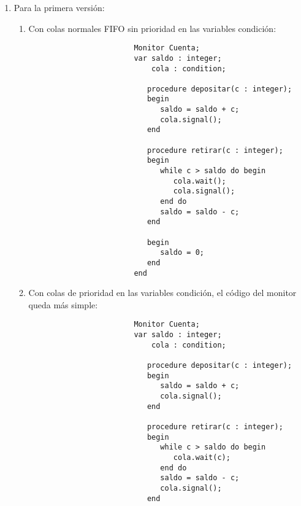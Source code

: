 \begin{ejercicio}
    \begin{enumerate}
        \item Para la primera versión:
            \begin{enumerate}[label=\alph*)]
                \item Con colas normales FIFO sin prioridad en las variables condición:
                    \begin{verbatim}
                        Monitor Cuenta;
                        var saldo : integer;
                            cola : condition;

                           procedure depositar(c : integer);
                           begin
                              saldo = saldo + c;
                              cola.signal();
                           end

                           procedure retirar(c : integer);
                           begin
                              while c > saldo do begin
                                 cola.wait();
                                 cola.signal();
                              end do
                              saldo = saldo - c;
                           end

                           begin
                              saldo = 0;
                           end
                        end
                    \end{verbatim}
                \item Con colas de prioridad en las variables condición, el código del monitor queda más simple:
                    \begin{verbatim}
                        Monitor Cuenta;
                        var saldo : integer;
                            cola : condition;

                           procedure depositar(c : integer);
                           begin
                              saldo = saldo + c;
                              cola.signal();
                           end

                           procedure retirar(c : integer);
                           begin
                              while c > saldo do begin
                                 cola.wait(c);
                              end do
                              saldo = saldo - c;
                              cola.signal();
                           end


\end{verbatim}
\end{enumerate}
\end{enumerate}
\end{ejercicio}
